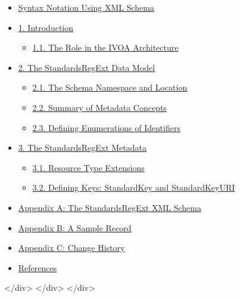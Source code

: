 \documentclass[11pt,a4paper]{ivoa}
\begin{document}
{{\begin{itemize}
\item \href{#synnot}{Syntax Notation Using XML Schema}{}

\item \href{#Intro}{1. Introduction}
\begin{itemize}

\item \href{#role}{1.1. The Role in the IVOA Architecture}{}

\end{itemize}
{}

\item \href{#model}{2. The StandardsRegExt Data Model}
\begin{itemize}

\item \href{#ns}{2.1. The Schema Namespace and Location}{}

\item \href{#summ}{2.2. Summary of Metadata Concepts}{}

\item \href{#defkeys}{2.3. Defining Enumerations of Identifiers}{}

\end{itemize}
{}

\item \href{#metadata}{3. The StandardsRegExt Metadata}
\begin{itemize}

\item \href{#resext}{3.1.  Resource Type Extensions}{}

\item \href{#stdkey}{3.2.  Defining Keys: StandardKey and StandardKeyURI}{}

\end{itemize}
{}

\item \href{#appA}{Appendix A: The StandardsRegExt XML Schema}{}

\item \href{#appB}{Appendix B: A Sample Record}{}

\item \href{#appC}{Appendix C: Change History}{}

\item \href{#References}{References}{}

\end{itemize}
</div>
</div>
</div>


}}
\end{document}
